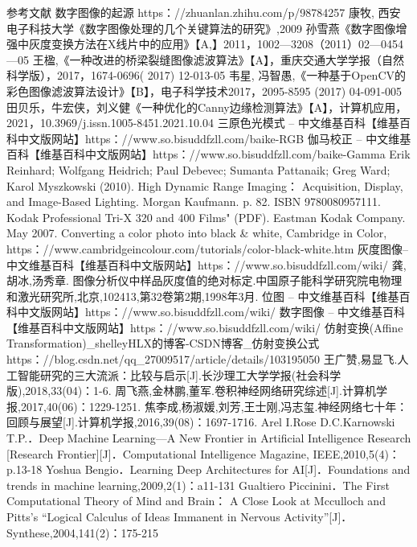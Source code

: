 参考文献
	数字图像的起源 https：//zhuanlan.zhihu.com/p/98784257 
	康牧, 西安电子科技大学《数字图像处理的几个关键算法的研究》,2009
	孙雪燕《数字图像增强中灰度变换方法在X线片中的应用》【A,】2011，1002—3208（2011）02—0454—05
	王楹,《一种改进的桥梁裂缝图像滤波算法》【A】，重庆交通大学学报（自然科学版），2017，1674-0696( 2017) 12-013-05
	韦星, 冯智愚,《一种基于OpenCV的彩色图像滤波算法设计》【B】，电子科学技术2017，2095-8595 (2017) 04-091-005
	田贝乐，牛宏侠，刘义健《一种优化的Canny边缘检测算法》【A】，计算机应用，2021，10.3969/j.issn.1005-8451.2021.10.04
	三原色光模式 – 中文维基百科【维基百科中文版网站】https：//www.so.bisuddfzll.com/baike-RGB%
	伽马校正 – 中文维基百科【维基百科中文版网站】https：//www.so.bisuddfzll.com/baike-Gamma%
	Erik Reinhard; Wolfgang Heidrich; Paul Debevec; Sumanta Pattanaik; Greg Ward; Karol Myszkowski (2010). High Dynamic Range Imaging： Acquisition, Display, and Image-Based Lighting. Morgan Kaufmann. p. 82. ISBN 9780080957111.
	Kodak Professional Tri-X 320 and 400 Films" (PDF). Eastman Kodak Company. May 2007.
	Converting a color photo into black & white, Cambridge in Color, https：//www.cambridgeincolour.com/tutorials/color-black-white.htm 
	灰度图像– 中文维基百科【维基百科中文版网站】https：//www.so.bisuddfzll.com/wiki/%
	龚,胡冰,汤秀章. 图像分析仪中样品灰度值的绝对标定.中国原子能科学研究院电物理和激光研究所,北京,102413,第32卷第2期,1998年3月.
	位图 – 中文维基百科【维基百科中文版网站】https：//www.so.bisuddfzll.com/wiki/%
	数字图像 – 中文维基百科【维基百科中文版网站】https：//www.so.bisuddfzll.com/wiki/%
	仿射变换(Affine Transformation)_shelleyHLX的博客-CSDN博客_仿射变换公式 https：//blog.csdn.net/qq_27009517/article/details/103195050 
	王广赞,易显飞.人工智能研究的三大流派：比较与启示[J].长沙理工大学学报(社会科学版),2018,33(04)：1-6.
	周飞燕,金林鹏,董军.卷积神经网络研究综述[J].计算机学报,2017,40(06)：1229-1251.
	焦李成,杨淑媛,刘芳,王士刚,冯志玺.神经网络七十年：回顾与展望[J].计算机学报,2016,39(08)：1697-1716.
	Arel I.Rose D.C.Karnowski T.P.．Deep Machine Learning---A New Frontier in Artificial Intelligence Research [Research Frontier][J]．Computational Intelligence Magazine, IEEE,2010,5(4)：p.13-18
	Yoshua Bengio．Learning Deep Architectures for AI[J]．Foundations and trends in machine learning,2009,2(1)：a11-131
	Gualtiero Piccinini．The First Computational Theory of Mind and Brain： A Close Look at Mcculloch and Pitts's “Logical Calculus of Ideas Immanent in Nervous Activity”[J]．Synthese,2004,141(2)：175-215
